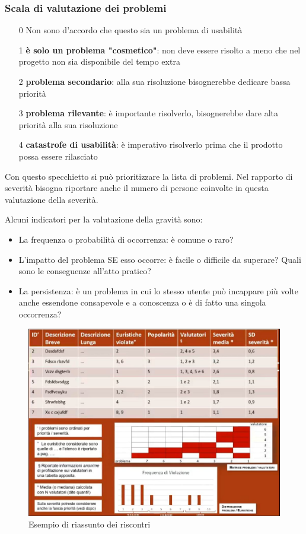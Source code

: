 \documentclass[11pt,a4paper]{book}
\begin{document}
\subsubsection{Scala di valutazione dei problemi}
\begin{itemize}
	\item[0] Non sono d'accordo che questo sia un problema di usabilità
	\item[1] \textbf{è solo un problema "cosmetico"}: non deve essere risolto a meno che nel progetto non sia disponibile del tempo extra 
	\item[2] \textbf{problema secondario}: alla sua risoluzione bisognerebbe dedicare bassa priorità
	\item[3] \textbf{problema rilevante}: è importante risolverlo, bisognerebbe dare alta priorità alla sua risoluzione
	\item[4] \textbf{catastrofe di usabilità}: è imperativo risolverlo prima che il prodotto possa essere rilasciato
\end{itemize}
Con questo specchietto si può prioritizzare la lista di problemi. Nel rapporto di severità bisogna riportare anche il numero di persone coinvolte in questa valutazione della severità.

Alcuni indicatori per la valutazione della gravità sono:
\begin{itemize}
	\item La frequenza o probabilità di occorrenza: è comune o raro?
	\item L'impatto del problema SE esso occorre: è facile o difficile da superare? Quali sono le conseguenze all'atto pratico?
	\item La persistenza: è un problema in cui lo stesso utente può incappare più volte anche essendone consapevole e a conoscenza o è di fatto una singola occorrenza?
\end{itemize}

\begin{figure}[h!]
	\begin{center}
		\includegraphics[scale=0.6]{img/016.jpg}
		\caption{Esempio di riassunto dei riscontri}
		\label{fig: 016}
	\end{center}
\end{figure}
\end{document}

